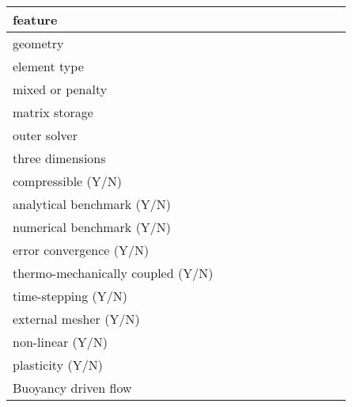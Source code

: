\begin{landscape}
\vspace{.5cm}










\noindent 
{\scriptsize
\begin{tabular}{|l|p{1.5cm}|p{1.5cm}|p{1.5cm}|p{1.5cm}|p{1.5cm}|p{1.5cm}|p{1.5cm}|p{1.5cm}|p{1.5cm}|p{1.5cm}|} 
\hline
feature & &&&&&&&&& \\ 
\hline
geometry &  &&&&&&&&& \\
element type &&&&&&&&&\\ 
mixed or penalty  & &&&&&&&&& \\
matrix storage & & &&&&&&&& \\
outer solver &  &&&&&&&&& \\
\hline
three dimensions &  &&&&&&&&& \\
compressible (Y/N) &&&&&&&&&& \\
analytical benchmark (Y/N) &&&&&&&&&& \\
numerical benchmark (Y/N) &  &&&&&&&&& \\
error convergence (Y/N) & &&&&&&&&& \\
thermo-mechanically coupled (Y/N) &&&&&&&&&& \\
time-stepping (Y/N) &&&&&&&&&& \\
external mesher (Y/N) &&&&&&&&&& \\
non-linear (Y/N) &&&&&&&&&& \\
plasticity (Y/N) & &  &&&&&&&&\\ 
Buoyancy driven flow & &  &&&&&&&\\
\hline
\end{tabular}
}


\end{landscape}
